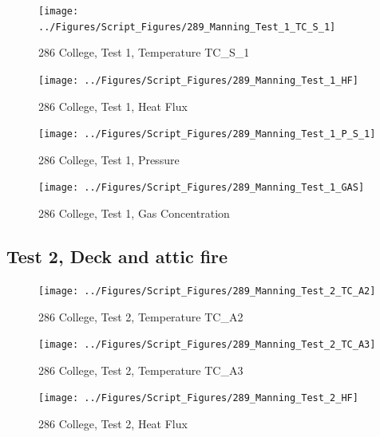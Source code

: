 \documentclass[12pt,oneside]{book}
\begin{document}
\begin{figure}[!ht]
\texttt{[image: ../Figures/Script\_Figures/289\_Manning\_Test\_1\_TC\_S\_1]}
\caption{286 College, Test 1, Temperature TC\_S\_1}
\label{fig:289_Manning_Test_1_TC_S_1}
\end{figure}

\begin{figure}[!ht]
\texttt{[image: ../Figures/Script\_Figures/289\_Manning\_Test\_1\_HF]}
\caption{286 College, Test 1, Heat Flux}
\label{fig:289_Manning_Test_1_HF}
\end{figure}

\begin{figure}[!ht]
\texttt{[image: ../Figures/Script\_Figures/289\_Manning\_Test\_1\_P\_S\_1]}
\caption{286 College, Test 1, Pressure}
\label{fig:289_Manning_Test_1_P_S_1}
\end{figure}

\begin{figure}[!ht]
\texttt{[image: ../Figures/Script\_Figures/289\_Manning\_Test\_1\_GAS]}
\caption{286 College, Test 1, Gas Concentration}
\label{fig:289_Manning_Test_1_GAS}
\end{figure}


\clearpage


\subsection{Test 2, Deck and attic fire}

\begin{figure}[!ht]
\texttt{[image: ../Figures/Script\_Figures/289\_Manning\_Test\_2\_TC\_A2]}
\caption{286 College, Test 2, Temperature TC\_A2}
\label{fig:289_Manning_Test_2_TC_A2}
\end{figure}

\begin{figure}[!ht]
\texttt{[image: ../Figures/Script\_Figures/289\_Manning\_Test\_2\_TC\_A3]}
\caption{286 College, Test 2, Temperature TC\_A3}
\label{fig:289_Manning_Test_2_TC_A3}
\end{figure}

\begin{figure}[!ht]
\texttt{[image: ../Figures/Script\_Figures/289\_Manning\_Test\_2\_HF]}
\caption{286 College, Test 2, Heat Flux}
\label{fig:289_Manning_Test_2_HF}
\end{figure}
\end{document}
